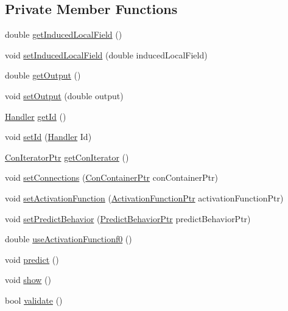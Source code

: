 \subsection*{Private Member Functions}
\begin{DoxyCompactItemize}
\item 
double \hyperlink{class_simple_neuron_ac7d28dffa06f0825c4b7d12e981ce9b1}{getInducedLocalField} ()
\item 
void \hyperlink{class_simple_neuron_a6f0a732980dc4860757b475539085324}{setInducedLocalField} (double inducedLocalField)
\item 
double \hyperlink{class_simple_neuron_ae5a325412827ad1f63e2a75f82023267}{getOutput} ()
\item 
void \hyperlink{class_simple_neuron_af59d76e80aea2bb224b817390f083bf9}{setOutput} (double output)
\item 
\hyperlink{_a_m_o_r_e_8h_abc871abb71cff6655b8172ee7240b8ef}{Handler} \hyperlink{class_simple_neuron_a2ed8cdd977472afaecca2c6b27c6beef}{getId} ()
\item 
void \hyperlink{class_simple_neuron_a7330de5a6a79925b950f78a65c529297}{setId} (\hyperlink{_a_m_o_r_e_8h_abc871abb71cff6655b8172ee7240b8ef}{Handler} Id)
\item 
\hyperlink{_a_m_o_r_e_8h_a819efaf710ead601ac8241df5e235dd8}{ConIteratorPtr} \hyperlink{class_simple_neuron_a53a18c4b7ff06ae1a05eadc7222c7197}{getConIterator} ()
\item 
void \hyperlink{class_simple_neuron_ae948c0b8c5e2a1013da5145a000e8b34}{setConnections} (\hyperlink{_a_m_o_r_e_8h_a1021dbaf961d1c8da6d58a8566e5778b}{ConContainerPtr} conContainerPtr)
\item 
void \hyperlink{class_simple_neuron_a3ccde895829b70bd0f6e42903d469b5f}{setActivationFunction} (\hyperlink{_a_m_o_r_e_8h_a77602a0277a02e5769c3df0adc669b17}{ActivationFunctionPtr} activationFunctionPtr)
\item 
void \hyperlink{class_simple_neuron_a8f230b4566e85adda71c7e0633d8a20d}{setPredictBehavior} (\hyperlink{_a_m_o_r_e_8h_a1fb2f1f8fdf1e08c42ef4bdce436af93}{PredictBehaviorPtr} predictBehaviorPtr)
\item 
double \hyperlink{class_simple_neuron_abf7f3ad2eac82aec49c1521d26521ff2}{useActivationFunctionf0} ()
\item 
void \hyperlink{class_simple_neuron_a232e6c3a7205372e3ccb7e93f26c58b6}{predict} ()
\item 
void \hyperlink{class_simple_neuron_afea22112336409283a5bb7d281f7f4bd}{show} ()
\item 
bool \hyperlink{class_simple_neuron_a9e7173abb892281d0b2ffb0efc82f0e5}{validate} ()
\end{DoxyCompactItemize}


